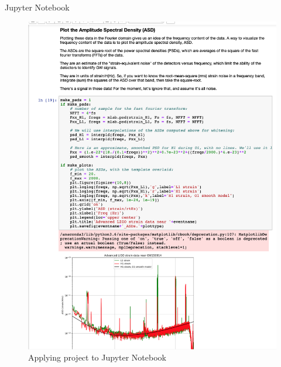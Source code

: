 \begin{frame}{Jupyter Notebook}
    
\begin{figure}
    \centering
    \includegraphics[width=.4\textwidth]{img/jupyter_losc_intro2.png}
    \caption{Applying project to Jupyter Notebook}
\end{figure}

\end{frame}